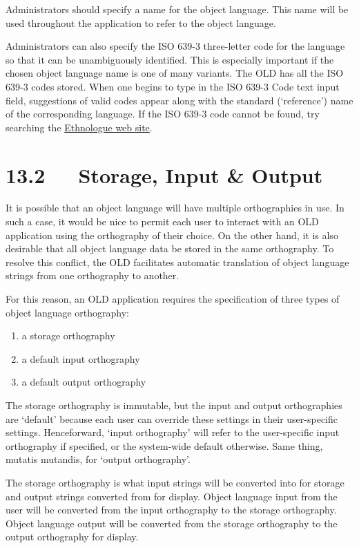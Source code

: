 \documentclass[letterpaper,10pt,english]{sphinxmanual}
\begin{document}
Administrators should specify a name for the object language.  This name will be
used throughout the application to refer to the object language.

Administrators can also specify the ISO 639-3 three-letter code for the language
so that it can be unambiguously identified.  This is especially important if the
chosen object language name is one of many variants.  The OLD has all the ISO
639-3 codes stored.  When one begins to type in the ISO 639-3 Code text input
field, suggestions of valid codes appear along with the standard (`reference')
name of the corresponding language.  If the ISO 639-3 code cannot be found, try
searching the \href{http://www.ethnologue.com}{Ethnologue web site}.


\section{13.2   Storage, Input \& Output}
\label{user_guide:storage-input-output}
It is possible that an object language will have multiple orthographies in use.
In such a case, it would be nice to permit each user to interact with an OLD
application using the orthography of their choice.  On the other hand, it is
also desirable that all object language data be stored in the same orthography.
To resolve this conflict, the OLD facilitates automatic translation of object
language strings from one orthography to another.

For this reason, an OLD application requires the specification of three types
of object language orthography:
\begin{enumerate}
\item {} 
a storage orthography

\item {} 
a default input orthography

\item {} 
a default output orthography

\end{enumerate}

The storage orthography is immutable, but the input and output orthographies are
`default' because each user can override these settings in their user-specific
settings.  Henceforward, `input orthography' will refer to the user-specific
input orthography if specified, or the system-wide default otherwise.  Same
thing, mutatis mutandis, for `output orthography'.

The storage orthography is what input strings will be converted into for storage
and output strings converted from for display.  Object language input from the
user will be converted from the input orthography to the storage orthography.
Object language output will be converted from the storage orthography to the
output orthography for display.
\end{document}

